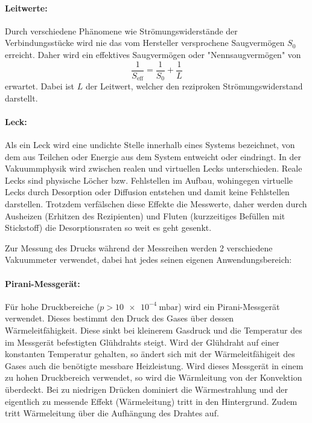  \paragraph{Leitwerte:}
 Durch verschiedene Phänomene wie Strömungswiderstände der Verbindungsstücke wird nie das vom Hersteller versprochene Saugvermögen $S_0$ erreicht.
 Daher wird ein effektives Saugvermögen oder "Nennsaugvermögen" von
 \begin{equation}
   \frac{1}{S_\text{eff}} = \frac{1}{S_0} + \frac{1}{L}
   \label{eqn:effSaug}
 \end{equation}
 erwartet. Dabei ist $L$ der Leitwert, welcher den reziproken Strömungswiderstand darstellt.

 \paragraph{Leck:}
 Als ein Leck wird eine undichte Stelle innerhalb eines Systems bezeichnet, von dem aus Teilchen oder Energie aus dem System
 entweicht oder eindringt.
 In der Vakuummphysik wird zwischen realen und virtuellen Lecks unterschieden. Reale Lecks sind physische Löcher bzw. Fehlstellen
 im Aufbau, wohingegen virtuelle Lecks durch Desorption oder Diffusion entstehen und damit keine Fehlstellen darstellen.
 Trotzdem verfälschen diese Effekte die Messwerte, daher werden durch Ausheizen (Erhitzen des Rezipienten) und Fluten (kurzzeitiges
 Befüllen mit Stickstoff) die Desorptionsraten so weit es geht gesenkt.

 Zur Messung des Drucks während der Messreihen werden 2 verschiedene Vakuummeter verwendet, dabei hat jedes seinen eigenen Anwendungsbereich:

 \paragraph{Pirani-Messgerät:}
 Für hohe Druckbereiche ($p > \SI{10e-4}{\milli\bar}$) wird ein Pirani-Messgerät verwendet. Dieses bestimmt den Druck des Gases über dessen Wärmeleitfähigkeit. Diese sinkt
 bei kleinerem Gasdruck und die Temperatur des im Messgerät befestigten Glühdrahts steigt. Wird der Glühdraht auf einer konstanten Temperatur gehalten,
 so ändert sich mit der Wärmeleitfähigeit des Gases auch die benötigte messbare Heizleistung.
 Wird dieses Messgerät in einem zu hohen Druckbereich verwendet, so wird die Wärmleitung von der Konvektion überdeckt. Bei zu niedrigen
 Drücken dominiert die Wärmestrahlung und der eigentlich zu messende Effekt (Wärmeleitung) tritt in den Hintergrund. Zudem tritt Wärmeleitung
 über die Aufhängung des Drahtes auf.

